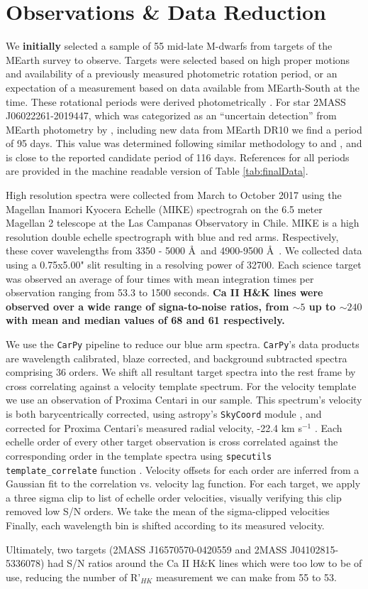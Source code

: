 \section{Observations \& Data Reduction}\label{sec:Observations}
We \textbf{initially} selected a sample of 55 mid-late M-dwarfs from targets of
the MEarth survey \citep{Ber12} to observe. Targets were selected based on high
proper motions and availability of a previously measured photometric rotation
period, or an expectation of a measurement based on data available from
MEarth-South at the time. These rotational periods were derived photometrically
\citep[e.g.][]{Newton2016,Man16,Med20}. For star 2MASS J06022261-2019447, which
was categorized as an ``uncertain detection'' from MEarth photometry by
\citet{Newton2018}, including new data from MEarth DR10 we find a period of 95
days. This value was determined following similar methodology to \citet{Irw11}
and \citet{Newton2016,Newton2018}, and is close to the reported candidate
period of 116 days.  References for all periods are provided in the machine
readable version of Table \ref{tab:finalData}.   

High resolution spectra were collected from March to October 2017 using the
Magellan Inamori Kyocera Echelle (MIKE) spectrograh on the 6.5 meter Magellan 2
telescope at the Las Campanas Observatory in Chile. MIKE is a high resolution
double echelle spectrograph with blue and red arms. Respectively, these cover
wavelengths from 3350 - 5000 \AA\ and 4900-9500 \AA\ \citep{Ber03}. We
collected data using a 0.75x5.00" slit resulting in a resolving power of 32700.
Each science target was observed an average of four times with mean integration
times per observation ranging from 53.3 to 1500 seconds. \textbf{Ca II H\&K
lines were observed over a wide range of signa-to-noise ratios, from $\sim 5$ up
to $\sim 240$ with mean and median values of 68 and 61 respectively.}

We use the \texttt{CarPy} pipeline \citep{Kel00, Kel03} to reduce our blue arm
spectra. \texttt{CarPy}'s data products are wavelength calibrated, blaze
corrected, and background subtracted spectra comprising 36 orders. We shift all
resultant target spectra into the rest frame by cross correlating against a
velocity template spectrum. For the velocity template we use an observation of
Proxima Centari in our sample. This spectrum's velocity is both barycentrically
corrected, using astropy's \texttt{SkyCoord} module \citep{Ast18}, and
corrected for Proxima Centari's measured radial velocity, -22.4 km s$^{-1}$
\citep{Tor06}. Each echelle order of every other target observation is cross
correlated against the corresponding order in the template spectra using
\texttt{specutils} \texttt{template\_correlate} function \citep{Nic21}.
Velocity offsets for each order are inferred from a Gaussian fit to the
correlation vs. velocity lag function. For each target, we apply a three sigma
clip to list of echelle order velocities, visually verifying this clip removed
low S/N orders. We take the mean of the sigma-clipped velocities Finally, each
wavelength bin is shifted according to its measured velocity.

Ultimately, two targets (2MASS J16570570-0420559 and 2MASS J04102815-5336078)
had S/N ratios around the Ca II H\&K lines which were too low to be of use,
reducing the number of R'$_{HK}$ measurement we can make from 55 to 53. 
